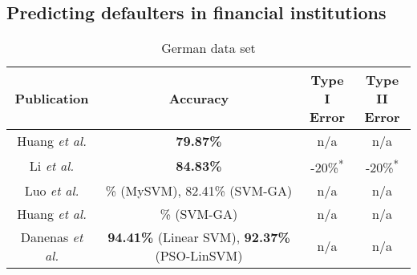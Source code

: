 \documentclass{sig-alternate-05-2015}
\begin{document}
	\subsection{Predicting defaulters in financial institutions}
	\begin{table}
		\small
		\caption{German data set\textsuperscript{\textparagraph}}
		\label{table:german_dataset}	
		\begin{tabular}{c|c|c|c} \hline		
			Publication&Accuracy&\parbox[t]{1.2cm}{\centering Type I\\Error}&\parbox[t]{1.2cm}{\centering Type II\\Error}\rule{0pt}{3mm}\rule[-0mm]{0pt}{0pt}\\ \hline
			\parbox[t]{2.3cm}{Huang \textit{et al.} \cite{Huang2004543}}
			&\parbox[t]{2.3cm}{\centering \textbf{79.87\%}\textsuperscript{\textdagger}}
			&\parbox[t]{1.1cm}{\centering n/a}
			&\parbox[t]{1.2cm}{\centering n/a}\rule{0pt}{3.5mm}\rule[-0mm]{0pt}{0pt}\\ \hline
			\parbox[t]{2.3cm}{Li \textit{et al.} \cite{Li2006772}}
			&\parbox[t]{2.3cm}{\centering \textbf{84.83\%}}
			&\parbox[t]{1.1cm}{-20\%\textsuperscript{*}}
			&\parbox[t]{1.2cm}{-20\%\textsuperscript{*}}\\ \hline
			\parbox[t]{2.3cm}{Luo \textit{et al.} \cite{Luo20097562}}
			&\parbox[t]{2.3cm}{\% (MySVM), 82.41\% (SVM-GA)\textsuperscript{\textdagger}}
			&\parbox[t]{1.1cm}{\centering n/a}
			&\parbox[t]{1.2cm}{\centering n/a}\rule{0pt}{3.5mm}\rule[-0mm]{0pt}{0pt}\\ \hline
			\parbox[t]{2.3cm}{Huang \textit{et al.} \cite{Huang2007847}}
			&\parbox[t]{2.3cm}{\% (SVM-GA)\textsuperscript{\textdagger}}
			&\parbox[t]{1.1cm}{\centering n/a}
			&\parbox[t]{1.2cm}{\centering n/a}\rule{0pt}{3.5mm}\rule[-0mm]{0pt}{0pt}\\ \hline
			\parbox[t]{2.3cm}{Danenas \textit{et al.} \cite{Danenas20153194}}
			&\parbox[t]{2.3cm}{\centering \textbf{94.41\%} (Linear SVM), \textbf{92.37\%} (PSO-LinSVM)\textsuperscript{\textdagger}}
			&\parbox[t]{1.1cm}{\centering n/a\textsuperscript{\textdaggerdbl}}
			&\parbox[t]{1.2cm}{\centering n/a\textsuperscript{\textdaggerdbl}}\rule{0pt}{3.5mm}\rule[-8mm]{0pt}{0pt}		
		\end{tabular}		
	\end{table}
	
\end{document}

